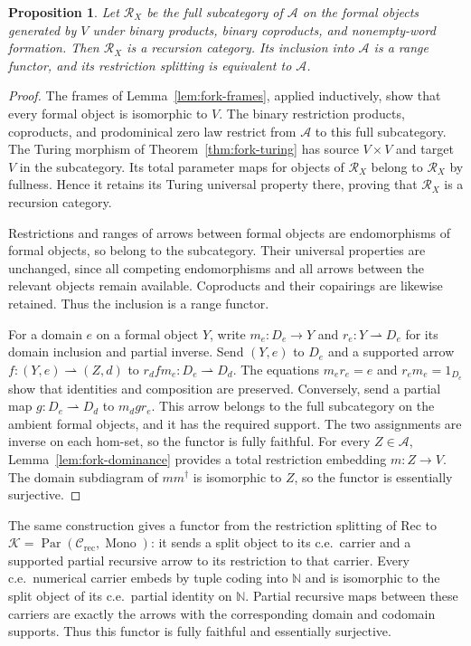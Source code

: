 \documentclass[11pt]{article}
\newtheorem{proposition}[theorem]{Proposition}
\newcommand{\N}{\mathbb N}
\begin{document}
\begin{proposition}\label{prop:fork-recursion}
Let $\mathscr R_X$ be the full subcategory of
$\mathcal A$ on the formal objects generated by $V$ under
binary products, binary coproducts, and nonempty-word formation.
Then $\mathscr R_X$ is a recursion category. Its inclusion
into $\mathcal A$ is a range functor, and its restriction
splitting is equivalent to $\mathcal A$.
\end{proposition}
\begin{proof}
The frames of Lemma~\ref{lem:fork-frames}, applied inductively,
show that every formal object is isomorphic to $V$.
The binary restriction products, coproducts, and prodominical
zero law restrict from $\mathcal A$ to this full subcategory.
The Turing morphism of Theorem~\ref{thm:fork-turing} has
source $V\times V$ and target $V$ in the subcategory.
Its total parameter maps for objects of $\mathscr R_X$ belong
to $\mathscr R_X$ by fullness. Hence it retains its Turing
universal property there, proving that $\mathscr R_X$ is a
recursion category.

Restrictions and ranges of arrows between formal objects are
endomorphisms of formal objects, so belong to the subcategory.
Their universal properties are unchanged, since all competing
endomorphisms and all arrows between the relevant objects remain
available. Coproducts and their copairings are likewise retained.
Thus the inclusion is a range functor.

For a domain $e$ on a formal object $Y$, write
$m_e:D_e\to Y$ and $r_e:Y\rightharpoonup D_e$ for its
domain inclusion and partial inverse. Send $(Y,e)$ to $D_e$
and a supported arrow $f:(Y,e)\rightharpoonup(Z,d)$ to
$r_d f m_e:D_e\rightharpoonup D_d$.
The equations $m_er_e=e$ and $r_em_e=1_{D_e}$ show that
identities and composition are preserved. Conversely, send a
partial map $g:D_e\rightharpoonup D_d$ to $m_d g r_e$.
This arrow belongs to the full subcategory on the ambient
formal objects, and it has the required support. The two
assignments are inverse on each hom-set, so the functor is
fully faithful.
For every $Z\in\mathcal A$, Lemma~\ref{lem:fork-dominance}
provides a total restriction embedding $m:Z\to V$.
The domain subdiagram of $mm^\dagger$ is isomorphic to $Z$,
so the functor is essentially surjective.
\end{proof}

The same construction gives a functor from the restriction splitting
of $\mathrm{Rec}$ to
$\mathcal K=\operatorname{Par}(\mathcal C_{\mathrm{rec}},
\operatorname{Mono})$: it sends a split object to its c.e.\ carrier
and a supported partial recursive arrow to its restriction to that
carrier. Every c.e.\
numerical carrier embeds by tuple coding into $\N$ and is
isomorphic to the split object of its c.e.\ partial identity
on $\N$. Partial recursive maps between these carriers are
exactly the arrows with the corresponding domain and codomain
supports. Thus this functor is fully faithful and essentially surjective.
\end{document}
